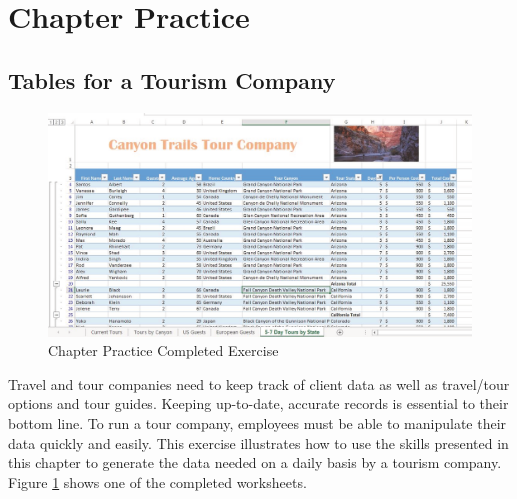 \section{Chapter Practice}

\subsection{Tables for a Tourism Company}

\begin{figure}[H]
	\centering
	\includegraphics[width=\maxwidth{.95\linewidth}]{gfx/ch05_fig30}
	\caption{Chapter Practice Completed Exercise}
	\label{05:fig30}
\end{figure}

Travel and tour companies need to keep track of client data as well as travel/tour options and tour guides. Keeping up-to-date, accurate records is essential to their bottom line. To run a tour company, employees must be able to manipulate their data quickly and easily. This exercise illustrates how to use the skills presented in this chapter to generate the data needed on a daily basis by a tourism company. Figure \ref{05:fig30} shows one of the completed worksheets.

